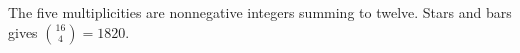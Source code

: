 The five multiplicities are nonnegative integers summing to twelve. Stars and bars gives $\binom{16}{4}=\boxed{1820}$.
